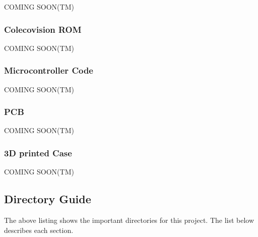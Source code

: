 \documentclass{article}
\begin{document}
  \par
  COMING SOON(TM)

  \subsubsection{Colecovision ROM}

  \par
  COMING SOON(TM)

  \subsubsection{Microcontroller Code}

  \par
  COMING SOON(TM)

  \subsubsection{PCB}

  \par
  COMING SOON(TM)

  \subsubsection{3D printed Case}

  \par
  COMING SOON(TM)

  \subsection{Directory Guide}


  \vspace{\baselineskip}

  \par
  The above listing shows the important directories for this project. The list below describes each section.
\end{document}
